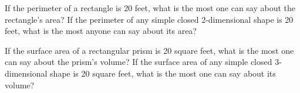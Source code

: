\begin{prob}
If the perimeter of a rectangle is 20 feet, what is the most one can say about the rectangle's area?  If the perimeter of any simple closed 2-dimensional shape is 20 feet, what is the most anyone can say about its area?
\end{prob}

\begin{prob}
If the surface area of a rectangular prism is 20 square feet, what is the most one can say about the prism's volume?  If the surface area of any simple closed 3-dimensional shape is 20 square feet, what is the most one can say about its volume? 
\end{prob}

%



